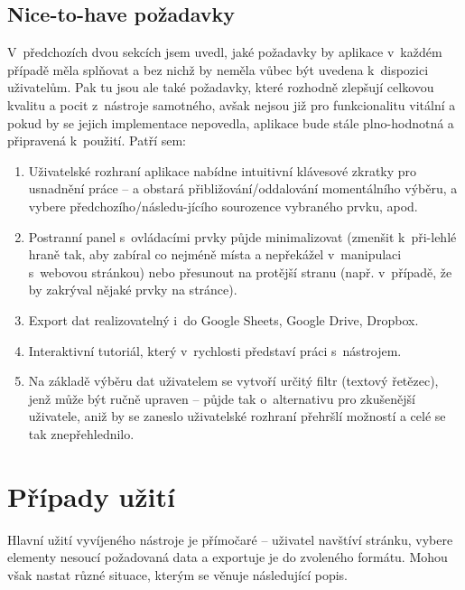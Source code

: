 \documentclass[thesis=B,czech]{FITthesis}[2012/06/26]
\begin{document}
\subsection{Nice-to-have požadavky}
V~předchozích dvou sekcích jsem uvedl, jaké požadavky by aplikace v~každém případě měla splňovat a bez nichž by neměla vůbec být uvedena k~dispozici uživatelům. Pak tu jsou ale také požadavky, které rozhodně zlepšují celkovou kvalitu a pocit z~nástroje samotného, avšak nejsou již pro funkcionalitu vitální a pokud by se jejich implementace nepovedla, aplikace bude stále plno-hodnotná a připravená k~použití. Patří sem:
\begin{enumerate}[+1)]
	\item Uživatelské rozhraní aplikace nabídne intuitivní klávesové zkratky pro usnadnění práce -- \textsf{} a \textsf{} obstará přibližování/oddalování momentálního výběru, \textsf{} a \textsf{} vybere předchozího/následu-jícího sourozence vybraného prvku, apod.
	\item Postranní panel s~ovládacími prvky půjde minimalizovat (zmenšit k~při-lehlé hraně tak, aby zabíral co nejméně místa a nepřekážel v~manipulaci s~webovou stránkou) nebo přesunout na protější stranu (např. v~případě, že by zakrýval nějaké prvky na stránce).
	\item Export dat realizovatelný i~do Google Sheets, Google Drive, Dropbox.
	\item Interaktivní tutoriál, který v~rychlosti představí práci s~nástrojem.
	\item Na základě výběru dat uživatelem se vytvoří určitý filtr (textový řetězec), jenž může být ručně upraven -- půjde tak o~alternativu pro zkušenější uživatele, aniž by se zaneslo uživatelské rozhraní přehršlí možností a celé se tak znepřehlednilo.
\end{enumerate}


\section{Případy užití}
Hlavní užití vyvíjeného nástroje je přímočaré -- uživatel navštíví stránku, vybere elementy nesoucí požadovaná data a exportuje je do zvoleného formátu. Mohou však nastat různé situace, kterým se věnuje následující popis.
\end{document}
